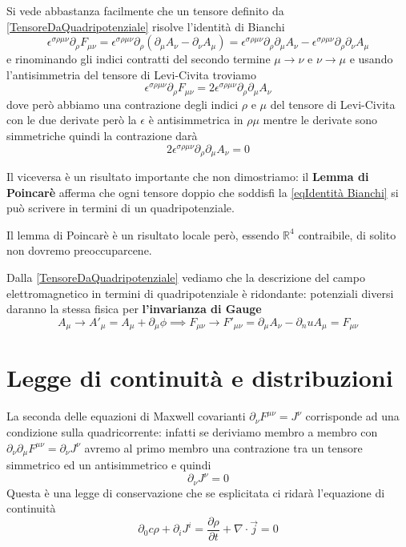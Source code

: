 \documentclass[12pt,a4paper,titlepage, twoside, openright]{book}
\numberwithin{equation}{chapter}
\begin{document}
Si vede abbastanza facilmente che un tensore definito da \eqref{TensoreDaQuadripotenziale} risolve l'identità di Bianchi 
\[
\epsilon^{\sigma\rho\mu\nu}\partial_\rho F_{\mu\nu}=\epsilon^{\sigma\rho\mu\nu}\partial_\rho \left( \partial_\mu A_\nu -\partial_\nu A_\mu \right) = 
\epsilon^{\sigma\rho\mu\nu}  \partial_\rho \partial_\mu A_\nu - \epsilon^{\sigma\rho\mu\nu}  \partial_\rho \partial_\nu A_\mu 
\]
e rinominando gli indici contratti del secondo termine $\mu\rightarrow\nu$ e $\nu\rightarrow\mu$ e usando l'antisimmetria del tensore di Levi-Civita troviamo
\[
\epsilon^{\sigma\rho\mu\nu}\partial_\rho F_{\mu\nu}=
2\epsilon^{\sigma\rho\mu\nu}  \partial_\rho \partial_\mu A_\nu
\]
dove però abbiamo una contrazione degli indici $\rho$ e $\mu$ del tensore di Levi-Civita con le due derivate però la $\epsilon$ è antisimmetrica in $\rho\mu$ mentre le derivate sono simmetriche quindi la contrazione darà
\[
2\epsilon^{\sigma\rho\mu\nu}  \partial_\rho \partial_\mu A_\nu=0\]

Il viceversa è un risultato importante che non dimostriamo: il \textbf{Lemma di Poincarè} afferma che ogni tensore doppio che soddisfi la \eqref{eqIdentità Bianchi} si può scrivere in termini di un quadripotenziale. 

Il lemma di Poincarè è un risultato locale però, essendo $\mathbb{R}^4$ contraibile, di solito non dovremo preoccuparcene.

Dalla \eqref{TensoreDaQuadripotenziale} vediamo che la descrizione del campo elettromagnetico in termini di quadripotenziale è ridondante: potenziali diversi daranno la stessa fisica per \textbf{l'invarianza di Gauge}
\begin{equation}\label{InvarianzaGauge}
A_\mu \rightarrow A'_\mu=A_\mu+\partial_\mu\phi \implies F_{\mu\nu}\rightarrow F'_{\mu\nu}=\partial_\mu A_\nu - \partial_nu A_\mu =F_{\mu\nu}
\end{equation}


\section{Legge di continuità e distribuzioni}

La seconda delle equazioni di Maxwell covarianti $\partial_\nu F^{\mu\nu}=J^\nu$ corrisponde ad una condizione sulla quadricorrente: infatti se deriviamo membro a membro con $\partial_\nu\partial_\mu F^{\mu\nu}=\partial_\nu J^\nu $ avremo al primo membro una contrazione tra un tensore simmetrico ed un antisimmetrico e quindi
\begin{equation}
\partial_\nu J^\nu =0
\end{equation}
Questa è una legge di conservazione che se esplicitata ci ridarà l'equazione di continuità
\[
\partial_0 c\rho + \partial_i J^i = \dfrac{\partial \rho}{\partial t} + \nabla\cdot\vec{j}=0
\]
\end{document}
